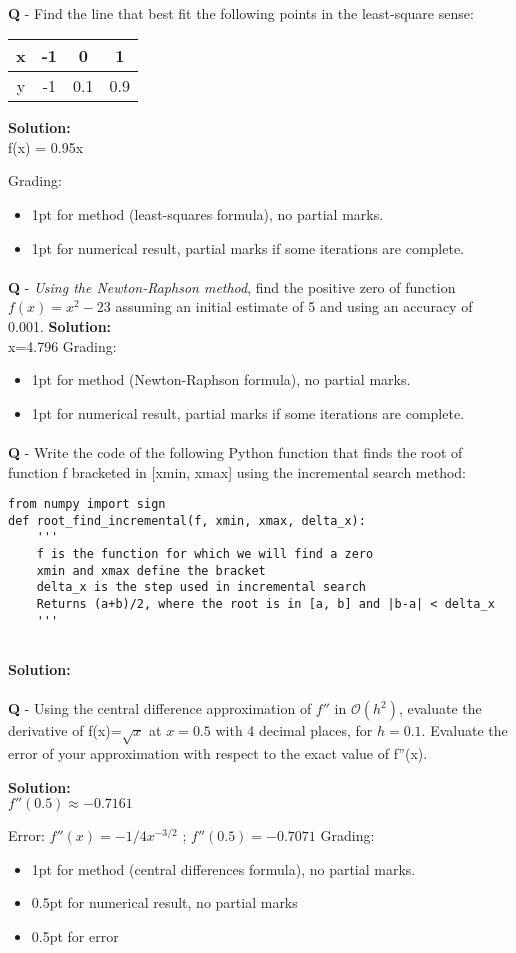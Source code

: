 \documentclass{llncs}
\newcounter{ques}
\renewcommand{\question}[1]{\paragraph{}\textbf{Q\theques} - #1\stepcounter{ques} }
\newcommand{\answer}[1]{\color{red}\textbf{Solution:}\\#1\color{black}}
\begin{document}
\question{Find the line that best fit the following points in the least-square sense:
\begin{center}
\begin{tabular}{|c|c|c|c|}
\hline
x & -1 &  0 & 1 \\
\hline
y & -1 & 0.1 & 0.9\\
\hline
\end{tabular}
\end{center}
}

\answer{
f(x) = 0.95x

Grading:
\begin{itemize}
\item 1pt for method (least-squares formula), no partial marks.
\item 1pt for numerical result, partial marks if some iterations are complete.
\end{itemize}
}


\newpage
\question{\emph{Using the Newton-Raphson method}, find the positive zero of function $f(x)=x^2-23$ assuming an initial estimate
of 5 and using an accuracy of 0.001.}
\answer{
x=4.796
Grading:
\begin{itemize}
\item 1pt for method (Newton-Raphson formula), no partial marks.
\item 1pt for numerical result, partial marks if some iterations are complete.
\end{itemize}
}

\newpage
\question{Write the code of the following Python function that finds the root of function f bracketed in [xmin, xmax] using the incremental search method:}
\begin{verbatim}
from numpy import sign
def root_find_incremental(f, xmin, xmax, delta_x):
    '''
    f is the function for which we will find a zero
    xmin and xmax define the bracket
    delta_x is the step used in incremental search
    Returns (a+b)/2, where the root is in [a, b] and |b-a| < delta_x
    '''
 
\end{verbatim}

\answer{
}


\newpage
\question{Using the central difference approximation of $f''$ in 
$\mathcal{O}(h^2)$, evaluate the derivative of f(x)=$\sqrt{x}$ at $x=0.5$ with 4 decimal places, 
for $h=0.1$. Evaluate the error of your 
approximation with respect to the exact value of f''(x).}

\answer{
$f''(0.5)\approx -0.7161$

Error: $f''(x) = -1/4x^{-3/2}$ ; $f''(0.5)=-0.7071$
Grading:
\begin{itemize}
\item 1pt for method (central differences formula), no partial marks.
\item 0.5pt for numerical result, no partial marks
\item 0.5pt for error
\end{itemize}
}
\end{document}
